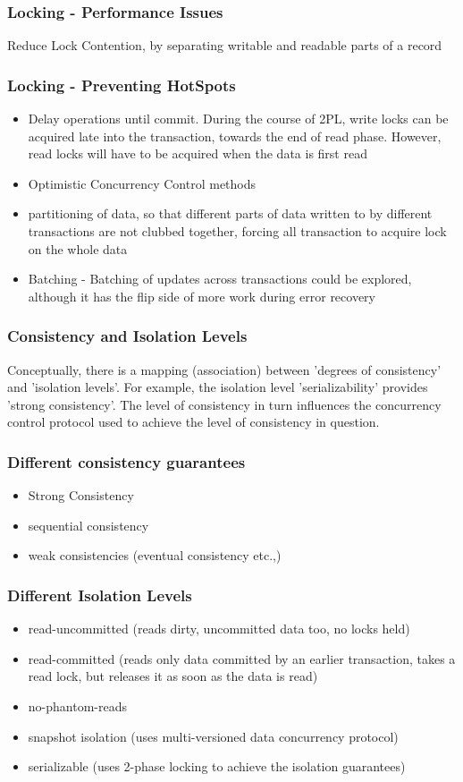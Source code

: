 \documentclass[12]{beamer}
\begin{document}
\begin{frame}
	\frametitle{Locking - Performance Issues}
  Reduce Lock Contention, by separating writable and readable parts of a record
\end{frame}

\begin{frame}
\frametitle{Locking - Preventing HotSpots}
\begin{itemize}
\item Delay operations until commit. During the course of 2PL, write locks can be acquired late into the transaction, towards the end of read phase. However, read locks will have to be acquired when the data is first read
\item Optimistic Concurrency Control methods
\item partitioning of data, so that different parts of data written to by different transactions are not clubbed together, forcing all transaction to acquire lock on the whole data
\item Batching - Batching of updates across transactions could be explored, although it has the flip side of more work during error recovery
\end{itemize}
\end{frame}

\begin{frame}
\frametitle{Consistency and Isolation Levels}
Conceptually, there is a mapping (association) between 'degrees of consistency' and 'isolation levels'. For example, the isolation level 'serializability' provides 'strong consistency'. The level of consistency in turn influences the concurrency control protocol used to achieve the level of consistency in question.
\end{frame}

%
%

\begin{frame}
\frametitle{Different consistency guarantees}
\begin{itemize}
\item Strong Consistency
\item sequential consistency
\item weak consistencies (eventual consistency etc.,)
\end{itemize}
\end{frame}

\begin{frame}
\frametitle{Different Isolation Levels}
\begin{itemize}
\item read-uncommitted (reads dirty, uncommitted data too, no locks held)
\item read-committed (reads only data committed by an earlier transaction, takes a read lock, but releases it as soon as the data is read)
\item no-phantom-reads
\item snapshot isolation (uses multi-versioned data concurrency protocol)
\item serializable (uses 2-phase locking to achieve the isolation guarantees)
\end{itemize}
\end{frame}
\end{document}
